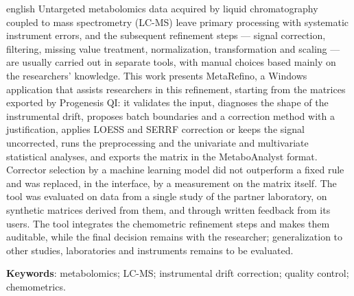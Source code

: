 \begin{resumo}[Abstract]
 \begin{otherlanguage*}{english}
   Untargeted metabolomics data acquired by liquid chromatography coupled to mass spectrometry (LC-MS) leave primary processing with systematic instrument errors, and the subsequent refinement steps --- signal correction, filtering, missing value treatment, normalization, transformation and scaling --- are usually carried out in separate tools, with manual choices based mainly on the researchers' knowledge. This work presents MetaRefino, a Windows application that assists researchers in this refinement, starting from the matrices exported by Progenesis QI: it validates the input, diagnoses the shape of the instrumental drift, proposes batch boundaries and a correction method with a justification, applies LOESS and SERRF correction or keeps the signal uncorrected, runs the preprocessing and the univariate and multivariate statistical analyses, and exports the matrix in the MetaboAnalyst format. Corrector selection by a machine learning model did not outperform a fixed rule and was replaced, in the interface, by a measurement on the matrix itself. The tool was evaluated on data from a single study of the partner laboratory, on synthetic matrices derived from them, and through written feedback from its users. The tool integrates the chemometric refinement steps and makes them auditable, while the final decision remains with the researcher; generalization to other studies, laboratories and instruments remains to be evaluated.

   \vspace{\onelineskip}

   \noindent
   \textbf{Keywords}: metabolomics; LC-MS; instrumental drift correction; quality control; chemometrics.
 \end{otherlanguage*}
\end{resumo}